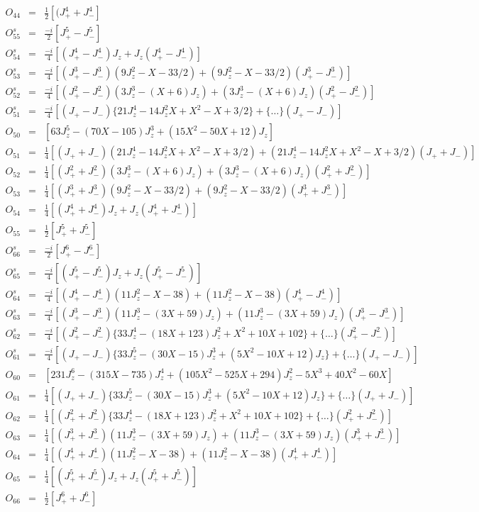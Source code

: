 \begin{eqnarray*}
O_{44}&=&\frac{1}{2}[(J_+^4+J_-^4]\\
\hline
O^s_{55}&=&\frac{-i}{2}[J_+^5-J_-^5] \\
O^s_{54}&=&\frac{-i}{4}[(J_+^4-J_-^4)J_z+J_z(J_+^4-J_-^4)] \\
O^s_{53}&=&\frac{-i}{4}[(J_+^3-J_-^3)(9J_z^2-X-33/2)+(9J_z^2-X-33/2)(J_+^3-J_-^3)] \\
O^s_{52}&=&\frac{-i}{4}[(J_+^2-J_-^2)(3J_z^3-(X+6)J_z)+(3J_z^3-(X+6)J_z)(J_+^2-J_-^2)]\\
O^s_{51}&=&\frac{-i}{4}[(J_+-J_-)\{21J_z^4-14J_z^2X+X^2-X+3/2\}+\{\dots\}(J_+-J_-)] \\
O_{50}&=&[63J_z^5-(70X-105)J_z^3+(15X^2-50X+12)J_z] \\
O_{51}&=&\frac{1}{4}[(J_++J_-)(21J_z^4-14J_z^2X+X^2-X+3/2)+(21J_z^4-14J_z^2X+X^2-X+3/2)(J_++J_-)] \\
O_{52}&=&\frac{1}{4}[(J_+^2+J_-^2)(3J_z^3-(X+6)J_z)+(3J_z^3-(X+6)J_z)(J_+^2+J_-^2)] \\
O_{53}&=&\frac{1}{4}[(J_+^3+J_-^3)(9J_z^2-X-33/2)+(9J_z^2-X-33/2)(J_+^3+J_-^3)] \\
O_{54}&=&\frac{1}{4}[(J_+^4+J_-^4)J_z+J_z(J_+^4+J_-^4)] \\
O_{55}&=&\frac{1}{2}[J_+^5+J_-^5] \\
\hline
O^s_{66}&=&\frac{-i}{2}[J_+^6-J_-^6]\\
O^s_{65}&=&\frac{-i}{4}[(J_+^5-J_-^5)J_z+J_z(J_+^5-J_-^5)] \\
O^s_{64}&=&\frac{-i}{4}[(J_+^4-J_-^4)(11J_z^2-X-38)+(11J_z^2-X-38)(J_+^4-J_-^4)] \\
O^s_{63}&=&\frac{-i}{4}[(J_+^3-J_-^3)(11J_z^3-(3X+59)J_z)+(11J_z^3-(3X+59)J_z)(J_+^3-J_-^3)] \\
O^s_{62}&=&\frac{-i}{4}[(J_+^2-J_-^2)\{33J_z^4-(18X+123)J_z^2+X^2+10X+102\}+\{\dots\}(J_+^2-J_-^2)] \\
O^s_{61}&=&\frac{-i}{4}[(J_+-J_-)\{33J_z^5-(30X-15)J_z^3+(5X^2-10X+12)J_z\}+\{\dots\}(J_+-J_-)] \\
O_{60}&=&[231J_z^6-(315X-735)J_z^4+(105X^2-525X+294)J_z^2-5X^3+40X^2-60X] \\
O_{61}&=&\frac{1}{4}[(J_++J_-)\{33J_z^5-(30X-15)J_z^3+(5X^2-10X+12)J_z\}+\{\dots\}(J_++J_-)] \\
O_{62}&=&\frac{1}{4}[(J_+^2+J_-^2)\{33J_z^4-(18X+123)J_z^2+X^2+10X+102\}+\{\dots\}(J_+^2+J_-^2)] \\
O_{63}&=&\frac{1}{4}[(J_+^3+J_-^3)(11J_z^3-(3X+59)J_z)+(11J_z^3-(3X+59)J_z)(J_+^3+J_-^3)] \\
O_{64}&=&\frac{1}{4}[(J_+^4+J_-^4)(11J_z^2-X-38)+(11J_z^2-X-38)(J_+^4+J_-^4)] \\
O_{65}&=&\frac{1}{4}[(J_+^5+J_-^5)J_z+J_z(J_+^5+J_-^5)] \\
O_{66}&=&\frac{1}{2}[J_+^6+J_-^6]\\
\end{eqnarray*}



